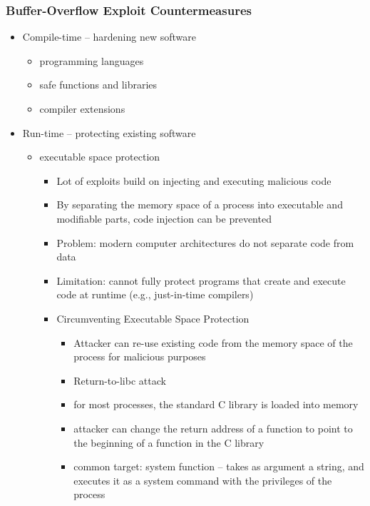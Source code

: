 \documentclass[final]{article}
\begin{document}
\subsubsection*{Buffer-Overflow Exploit Countermeasures}
\begin{itemize}
    \item Compile-time -- hardening new software
          \begin{itemize}[nosep]
              \item programming languages
              \item safe functions and libraries
              \item compiler extensions
          \end{itemize}
    \item Run-time -- protecting existing software
          \begin{itemize}[nosep]
              \item executable space protection
                    \begin{itemize}[nosep]
                        \item Lot of exploits build on injecting and executing malicious code
                        \item By separating the memory space of a process into executable and modifiable parts, code injection can be prevented
                        \item Problem: modern computer architectures do not separate code from data
                        \item Limitation: cannot fully protect programs that create and execute code at runtime (e.g., just-in-time compilers)
                        \item Circumventing Executable Space Protection
                              \begin{itemize}[nosep]
                                  \item Attacker can re-use existing code from the memory space of the process for malicious purposes
                                  \item Return-to-libc attack
                                  \item for most processes, the standard C library is loaded into memory
                                  \item attacker can change the return address of a function to point to the beginning of a function in the C library
                                  \item common target: system function -- takes as argument a string, and executes it as a system command with the privileges of the process

\end{itemize}
\end{itemize}
\end{itemize}
\end{itemize}
\end{document}
